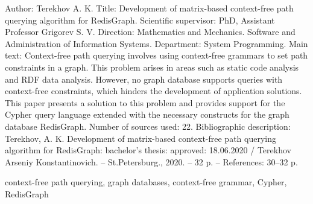 Author: Terekhov A. K.
Title: Development of matrix-based context-free path querying algorithm for RedisGraph.
Scientific supervisor: PhD, Assistant Professor Grigorev S. V.
Direction: Mathematics and Mechanics. Software and Administration of Information Systems.
Department: System Programming.
Main text:
Context-free path querying involves using context-free grammars to set path constraints in a graph. This problem arises in areas such as static code analysis and RDF data analysis. However, no graph database supports queries with context-free constraints, which hinders the development of application solutions. This paper presents a solution to this problem and provides support for the Cypher query language extended with the necessary constructs for the graph database RedisGraph.
Number of sources used: 22.
Bibliographic description: Terekhov, A. K. Development of matrix-based context-free path querying algorithm for RedisGraph: bachelor's thesis: approved: 18.06.2020 / Terekhov Arseniy Konstantinovich. – St.Petersburg., 2020. – 32 p. – References: 30–32 p.

context-free path querying, graph databases, context-free grammar, Cypher, RedisGraph